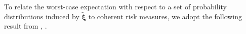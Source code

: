 \documentclass[final,onefignum,onetabnum]{class}
\newcommand{\bs}[1]{\boldsymbol{#1}} %
\newcommand{\Bs}[1]{\mathbb{#1}} %
\newcommand{\Cs}[1]{\mathcal{#1}} %
\newcommand{\txi}{\tilde{\bs{\xi}}}
\newcommand{\ol}[1]{\overline{#1}}
\newcommand{\Pspace}[1]{\left( \Xi, \Cs{F}, #1 \right)}
\begin{document}
To relate the worst-case expectation with respect to a set of probability distributions induced by $\txi$ to coherent risk measures, we adopt  the following result from \citet[Theorem~6.7]{shapiro2014SP}, \citet[Theorem~3.1]{shapiro2012minimax}. 

\begin{comment}
\begin{theorem}{\citet[Theorem~6.6]{shapiro2014SP}, \citet[Theorem~3.1]{shapiro2012minimax}}
	\label{thm: rev.duality_rho}
	Consider a probability space $\Pspace{Q}$, its associated spaces $\Cs{Z}=L_{\infty}\Pspace{Q}$ and $\Cs{Z}^{*}=L_{1}\Pspace{Q}$.  Recall $\Cs{D}=\sset*{\zeta \in \Cs{Z}^{*}}{\int_{\Xi} \zeta d Q=1, \; \zeta \ge 0, \ Q\text{-almost surely}} $. Let  $\rho: \Cs{Z} \mapsto \ol{\Bs{R}}$. Then, $\rho$  is a real-valued  
	coherent risk measure if and only if  %
	there exists a convex compact set $\Cs{M} \subseteq \Cs{D}$ (in the weakly* topology of $\Cs{Z}^{*}$)  such that 
	\begin{equation}
	\label{eq: duality_rho}
	\rho(Z)= \sup_{\zeta \in \Cs{M}} \ \langle Z,\zeta \rangle, \; \forall Z \in \Cs{Z}.
	\end{equation}
	Moreover, given a  real-valued coherent risk measure, the set $\Cs{M}$ in \eqref{eq: duality_rho} can be written in the form
	\begin{equation*}
	\Cs{M}= \sset*{\zeta \in \Cs{D}}{\langle Z,\zeta \rangle \le \rho(Z), \;  \forall Z \in \Cs{Z}}. 
	\end{equation*}
\end{theorem}
\end{comment}
\end{document}
